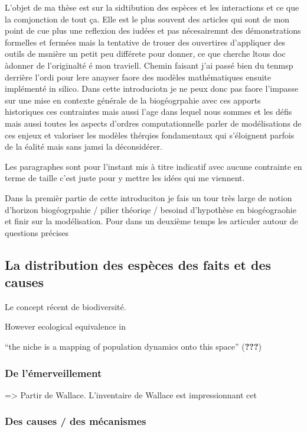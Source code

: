 L'objet de ma thèse est sur la sidtibution des espèces et les
interactions et ce que la comjonction de tout ça. Elle est le plus
souvent des articles qui sont de mon point de cue plus une reflexion des
iudées et pas nécesairemnt des démonstrations formelles et fermées mais
la tentative de trouer des ouvertires d'appliquer des outils de msnière
un petit peu différete pour donner, ce que cherche ltous doc àdonner de
l'originalté é mon traviell. Chemin faisant j'ai passé bien du tenmsp
derrière l'ordi pour lere anayser faore des modèles mathématiques
ensuite implémenté in silico. Dans cette introduciotn je ne peux donc
pas faore l'impasse sur une mise en contexte générale de la
biogéogrpahie avec ces apports historiques ces contraintes mais aussi
l'age dans lequel nous sommes et les défis mais aussi toutes les aspects
d'ordres computationnelle parler de modélisations de ces enjeux et
valoriser les modèles thérqies fondamentaux qui s'éloignent parfois de
la éalité mais sans jamsi la déconsidérer.

Les paragraphes sont pour l'instant mis à titre indicatif avec aucune
contrainte en terme de taille c'est juste pour y mettre les idées qui me
viennent.

Dans la premièr partie de cette introduciton je fais un tour très large
de notion d'horizon biogéogrpahie / pilier théoriqe / besoind
d'hypothèse en biogéograohie et finir sur la modélisation. Pour dans un
deuxième temps les articuler autour de questions précises

\subsection{La distribution des espèces des faits et des
causes}\label{la-distribution-des-espuxe8ces-des-faits-et-des-causes}

Le concept récent de biodiversité.

However ecological equivalence in

``the niche is a mapping of population dynamics onto this space''
({\textbf{???}})

\subsubsection{De l'émerveillement}\label{de-luxe9merveillement}

=\textgreater{} Partir de Wallace. L'inventaire de Wallace est
impressionnant cet

\subsubsection{Des causes / des
mécanismes}\label{des-causes-des-muxe9canismes}

